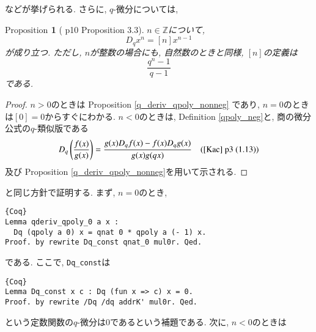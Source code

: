 \documentclass[11pt]{jarticle}
\theoremstyle{mystyle}
\newtheorem{prop}[df]{$\textrm{Proposition}$}
\newcommand{\bprop}{\begin{shadebox} \begin{prop}}
\newcommand{\eprop}{\end{prop} \end{shadebox}}
\newcommand{\bpf}{\begin{proof}}
\newcommand{\epf}{\end{proof}}
\newcommand{\Z}{\mathbb{Z}}
\newcommand{\0}{\textbf{0}}
\newcommand{\1}{\textbf{1}}
\newcommand{\2}{\textbf{2}}
\begin{document}
などが挙げられる. 
さらに, $q$-微分については, 
\bprop[\cite{Kac} p10 Proposition 3.3]
  $n \in \Z$について, 
  \[
    D_q x^n = [n] x ^{n - 1}
  \]
  が成り立つ. ただし, $n$が整数の場合にも, 自然数のときと同様, $[n]$の定義は
  \[
    \frac{q^n - 1}{q - 1}
  \]
  である. 
\eprop
\bpf
  $n > 0$のときは Proposition \ref{q_deriv_qpoly_nonneg} であり, $n = 0$のときは$[0] = 0$からすぐにわかる. 
  $n < 0$のときは, Definition \ref{qpoly_neg}と, 商の微分公式の$q$-類似版である
  \[
    D_q \left( \frac{f(x)}{g(x)} \right) = \frac{g(x) D_q f(x) - f(x) D_q g(x)}{g(x) g(qx)} \quad
    \text{(\cite{Kac} p3 (1.13))}
  \]
  及び Proposition \ref{q_deriv_qpoly_nonneg}を用いて示される. 
\epf
\cite{Kac}と同じ方針で証明する. まず, $n = 0$のとき, 
\begin{lstlisting}{Coq}
Lemma qderiv_qpoly_0 a x :
  Dq (qpoly a 0) x = qnat 0 * qpoly a (- 1) x.
Proof. by rewrite Dq_const qnat_0 mul0r. Qed.
\end{lstlisting}
である. ここで, {\tt Dq\_const}は
\begin{lstlisting}{Coq}
Lemma Dq_const x c : Dq (fun x => c) x = 0.
Proof. by rewrite /Dq /dq addrK' mul0r. Qed.
\end{lstlisting}
という定数関数の$q$-微分は$0$であるという補題である. 次に, $n < 0$のときは
\end{document}
